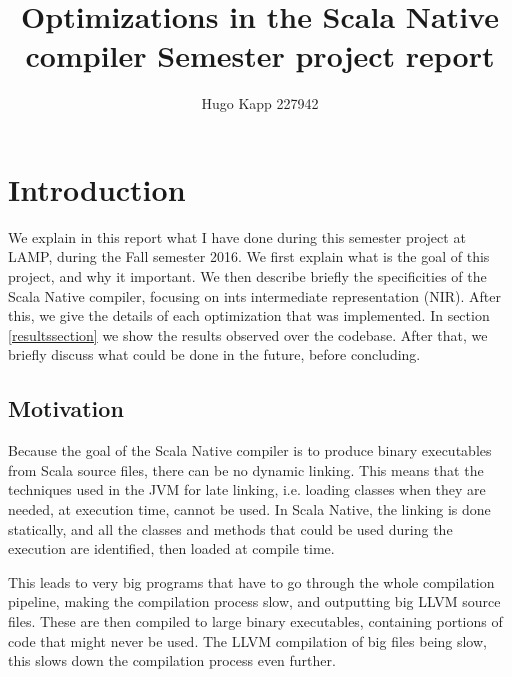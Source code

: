 \documentclass[12pt,a4paper]{article}
\author{Hugo Kapp 227942}
\title{Optimizations in the Scala Native compiler \newline \Large{Semester project report}}
\date{}
\begin{document}
\maketitle

\section{Introduction}

We explain in this report what I have done during this semester project at LAMP, during the Fall semester 2016. We first explain what is the goal of this project, and why it important. We then describe briefly the specificities of the Scala Native compiler, focusing on ints intermediate representation (NIR). After this, we give the details of each optimization that was implemented. In section \ref{resultssection} we show the results observed over the codebase. After that, we briefly discuss what could be done in the future, before concluding.

\subsection{Motivation}

Because the goal of the Scala Native compiler is to produce binary executables from Scala source files, there can be no dynamic linking. This means that the techniques used in the JVM for late linking, i.e. loading classes when they are needed, at execution time, cannot be used. In Scala Native, the linking is done statically, and all the classes and methods that could be used during the execution are identified, then loaded at compile time.

This leads to very big programs that have to go through the whole compilation pipeline, making the compilation process slow, and outputting big LLVM source files. These are then compiled to large binary executables, containing portions of code that might never be used. The LLVM compilation of big files being slow, this slows down the compilation process even further. 


\end{document}
